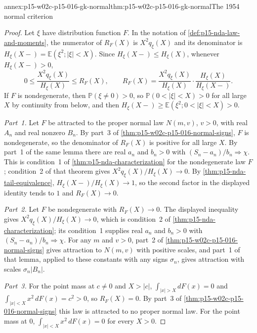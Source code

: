 \begin{annexitem}{annex:p15-w02c-p15-016-gk-normal}{thm:p15-w02c-p15-016-gk-normal}{The 1954 normal criterion}
\begin{proof}
Let \(\xi\) have distribution function \(F\). In the notation of
\cref{def:p15-nda-law-and-moments}, the numerator of \(R_F(X)\) is
\(X^2q_\xi(X)\) and its denominator is
\(H_\xi(X-)=\mathbb E(\xi^2;|\xi|<X)\). Since
\(H_\xi(X-)\leq H_\xi(X)\), whenever \(H_\xi(X-)>0\),
\[
 0\leq\frac{X^2q_\xi(X)}{H_\xi(X)}\leq R_F(X),
 \qquad
 R_F(X)=\frac{X^2q_\xi(X)}{H_\xi(X)}\cdot\frac{H_\xi(X)}{H_\xi(X-)} .
\]
If \(F\) is nondegenerate, then \(\mathbb P(\xi\neq0)>0\), so
\(\mathbb P(0<|\xi|<X)>0\) for all large \(X\) by continuity from
below, and then \(H_\xi(X-)\geq\mathbb E(\xi^2;0<|\xi|<X)>0\).

\emph{Part~1.} Let \(F\) be attracted to the proper normal law
\(N(m,v)\), \(v>0\), with real \(A_n\) and real nonzero \(B_n\). By
part~3 of \cref{thm:p15-w02c-p15-016-normal-signs}, \(F\) is
nondegenerate, so the denominator of \(R_F(X)\) is positive for all
large \(X\). By part~1 of the same lemma there are real \(a_n\) and
\(b_n>0\) with \((S_n-a_n)/b_n\Rightarrow\chi\). This is condition~1
of \cref{thm:p15-nda-characterization} for the nondegenerate law
\(F\); condition~2 of that theorem gives
\(X^2q_\xi(X)/H_\xi(X)\to0\). By
\cref{thm:p15-nda-tail-equivalence}, \(H_\xi(X-)/H_\xi(X)\to1\), so
the second factor in the displayed identity tends to \(1\) and \(R_F(X)\to0\).

\emph{Part~2.} Let \(F\) be nondegenerate with \(R_F(X)\to0\). The
displayed inequality gives \(X^2q_\xi(X)/H_\xi(X)\to0\), which is
condition~2 of \cref{thm:p15-nda-characterization}; its condition~1
supplies real \(a_n\) and \(b_n>0\) with
\((S_n-a_n)/b_n\Rightarrow\chi\). For any \(m\) and \(v>0\), part~2 of
\cref{thm:p15-w02c-p15-016-normal-signs} gives attraction to
\(N(m,v)\) with positive scales, and part~1 of that lemma, applied to
these constants with any signs \(\sigma_n\), gives attraction with
scales \(\sigma_n|B_n|\).

\emph{Part~3.} For the point mass at \(c\neq0\) and \(X>|c|\),
\(\int_{|x|>X}dF(x)=0\) and \(\int_{|x|<X}x^2\,dF(x)=c^2>0\), so
\(R_F(X)=0\). By part~3 of \cref{thm:p15-w02c-p15-016-normal-signs}
this law is attracted to no proper normal law. For the point mass at
\(0\), \(\int_{|x|<X}x^2\,dF(x)=0\) for every \(X>0\).
\end{proof}
\end{annexitem}

